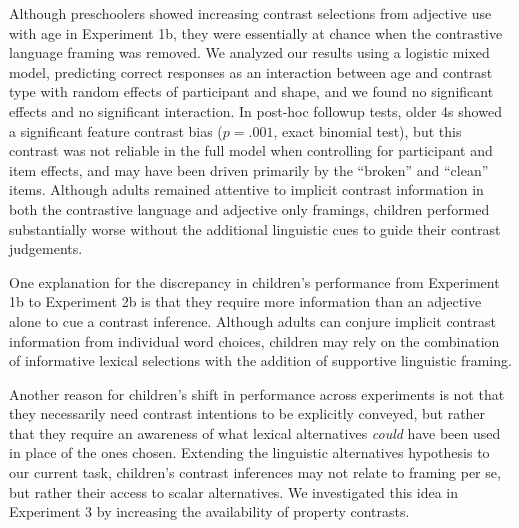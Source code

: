 \documentclass[10pt,letterpaper]{article}
\begin{document}
Although preschoolers showed increasing contrast selections from adjective use with age in Experiment 1b, they were essentially at chance when the contrastive language framing was removed.  We analyzed our results using a logistic mixed model, predicting correct responses as an interaction between age and contrast type with random effects of participant and shape, and we found no significant effects and no significant interaction. In post-hoc followup tests, older 4s showed a significant feature contrast bias ($p  = .001$, exact binomial test), but this contrast was not reliable in the full model when controlling for participant and item effects, and may have been driven primarily by the ``broken'' and ``clean'' items. Although adults remained attentive to implicit contrast information in both the contrastive language and adjective only framings, children performed substantially worse without the additional linguistic cues to guide their contrast judgements.  






One explanation for the discrepancy in children's performance from Experiment 1b to Experiment 2b is that they require more information than an adjective alone to cue a contrast inference.  Although adults can conjure implicit contrast information from individual word choices, children may rely on the combination of informative lexical selections with the addition of supportive linguistic framing.  

Another reason for children's shift in performance across experiments is not that they necessarily need contrast intentions to be explicitly conveyed, but rather that they require an awareness of what lexical alternatives \emph{could} have been used in place of the ones chosen.  Extending the linguistic alternatives hypothesis to our current task, children's contrast inferences may not relate to framing per se, but rather their access to scalar alternatives.  We investigated this idea in Experiment 3 by increasing the availability of property contrasts. 


\end{document}
